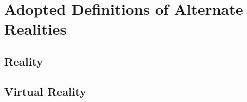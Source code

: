 \section{Adopted Definitions of Alternate Realities}

\subsection{Reality}

\subsection{Virtual Reality}


